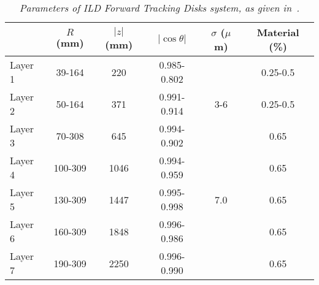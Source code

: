         \begin{table}[H]
        \begin{center}
        \begin{tabular}{l c c c c c }
        \hline
        			& $R$ (mm) & $|z|$ (mm) & $|\cos\theta|$ & $\sigma$ ($\mu$m) & Material (\%)\\
        \hline
            Layer 1 & 39-164 & 220 &  0.985-0.802 &  & 0.25-0.5 \\
            Layer 2 & 50-164 & 371 &  0.991-0.914 & 3-6 & 0.25-0.5 \\
        \hline
            Layer 3 & 70-308 & 645 &  0.994-0.902 &   & 0.65 \\
            Layer 4 & 100-309 & 1046 & 0.994-0.959 &   & 0.65 \\
            Layer 5 & 130-309 & 1447 & 0.995-0.998 &  7.0 & 0.65 \\
            Layer 6 & 160-309 & 1848 & 0.996-0.986 &    & 0.65 \\
            Layer 7 & 190-309 & 2250 & 0.996-0.990 &    & 0.65 \\
        \hline
        \end{tabular}
        \end{center}
        \caption{\sl Parameters of ILD Forward Tracking Disks system, as given in~\cite{bib:ILC}. }
        \label{table:ILCftdparam}
        \end{table}